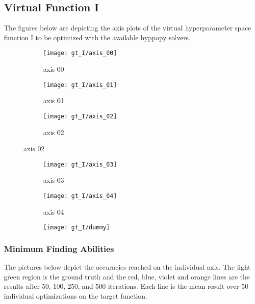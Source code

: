 \subsection{Virtual Function I}
The figures below are depicting the axis plots of the virtual hyperparameter space function I to be optimized with the available hyppopy solvers. 
\begin{figure}[h]
	\begin{subfigure}{0.32\textwidth}
		\texttt{[image: gt\_I/axis\_00]} 
		\caption{axis 00}
		\label{fig:axis00_I}
	\end{subfigure}
	\begin{subfigure}{0.32\textwidth}
		\texttt{[image: gt\_I/axis\_01]}
		\caption{axis 01}
		\label{fig:axis01_I}
	\end{subfigure}
	\begin{subfigure}{0.32\textwidth}
		\texttt{[image: gt\_I/axis\_02]}
		\caption{axis 02}
		\label{fig:axis02_I}
	\end{subfigure}
\end{figure}

\begin{figure}[h]
	\begin{subfigure}{0.32\textwidth}
		\texttt{[image: gt\_I/axis\_03]} 
		\caption{axis 03}
		\label{fig:axis03_I}
	\end{subfigure}
	\begin{subfigure}{0.32\textwidth}
		\texttt{[image: gt\_I/axis\_04]}
		\caption{axis 04}
		\label{fig:axis04_I}
	\end{subfigure}
	\begin{subfigure}{0.32\textwidth}
		\texttt{[image: gt\_I/dummy]}
		\caption{}
		\label{fig:dummy1_I}
	\end{subfigure}
\end{figure}


\newpage


\subsubsection{Minimum Finding Abilities}

The pictures below depict the accuracies reached on the individual axis. The light green region is the ground truth and the red, blue, violet and orange lines are the results after 50, 100, 250, and 500 iterations. Each line is the mean result over 50 individual optimizations on the target function.

